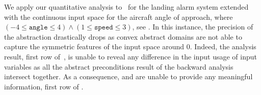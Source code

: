 

We apply our quantitative analysis to~ for the landing alarm system extended with the  continuous input space for the aircraft angle of approach, where $(-4 \le \texttt{angle} \le 4) \land (1 \le \texttt{speed} \le 3)$, see .
In this instance, the precision of the abstraction drastically drops as convex abstract domains are not able to capture the symmetric features of the input space around 0.
Indeed, the analysis result, first row of~, is unable to reveal any difference in the input usage of input variables as all the abstract preconditions result of the backward analysis intersect together.
As a consequence, \outcomesname{} and \rangename{} are unable to provide any meaningful information, first row of .

